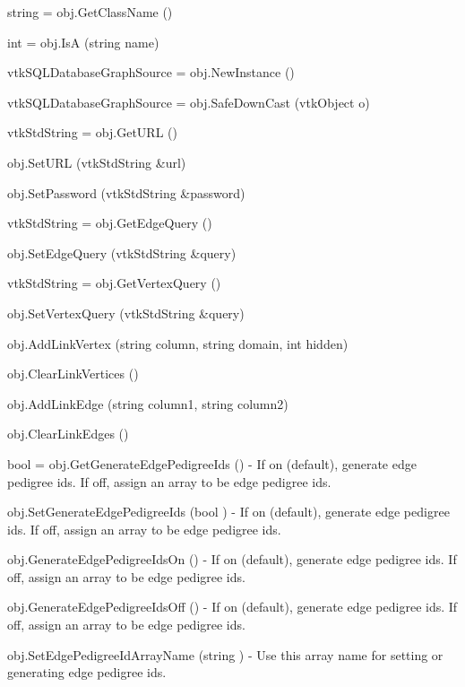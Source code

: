 \begin{DoxyItemize}
\item {\ttfamily string = obj.\-Get\-Class\-Name ()}  
\item {\ttfamily int = obj.\-Is\-A (string name)}  
\item {\ttfamily vtk\-S\-Q\-L\-Database\-Graph\-Source = obj.\-New\-Instance ()}  
\item {\ttfamily vtk\-S\-Q\-L\-Database\-Graph\-Source = obj.\-Safe\-Down\-Cast (vtk\-Object o)}  
\item {\ttfamily vtk\-Std\-String = obj.\-Get\-U\-R\-L ()}  
\item {\ttfamily obj.\-Set\-U\-R\-L (vtk\-Std\-String \&url)}  
\item {\ttfamily obj.\-Set\-Password (vtk\-Std\-String \&password)}  
\item {\ttfamily vtk\-Std\-String = obj.\-Get\-Edge\-Query ()}  
\item {\ttfamily obj.\-Set\-Edge\-Query (vtk\-Std\-String \&query)}  
\item {\ttfamily vtk\-Std\-String = obj.\-Get\-Vertex\-Query ()}  
\item {\ttfamily obj.\-Set\-Vertex\-Query (vtk\-Std\-String \&query)}  
\item {\ttfamily obj.\-Add\-Link\-Vertex (string column, string domain, int hidden)}  
\item {\ttfamily obj.\-Clear\-Link\-Vertices ()}  
\item {\ttfamily obj.\-Add\-Link\-Edge (string column1, string column2)}  
\item {\ttfamily obj.\-Clear\-Link\-Edges ()}  
\item {\ttfamily bool = obj.\-Get\-Generate\-Edge\-Pedigree\-Ids ()} -\/ If on (default), generate edge pedigree ids. If off, assign an array to be edge pedigree ids.  
\item {\ttfamily obj.\-Set\-Generate\-Edge\-Pedigree\-Ids (bool )} -\/ If on (default), generate edge pedigree ids. If off, assign an array to be edge pedigree ids.  
\item {\ttfamily obj.\-Generate\-Edge\-Pedigree\-Ids\-On ()} -\/ If on (default), generate edge pedigree ids. If off, assign an array to be edge pedigree ids.  
\item {\ttfamily obj.\-Generate\-Edge\-Pedigree\-Ids\-Off ()} -\/ If on (default), generate edge pedigree ids. If off, assign an array to be edge pedigree ids.  
\item {\ttfamily obj.\-Set\-Edge\-Pedigree\-Id\-Array\-Name (string )} -\/ Use this array name for setting or generating edge pedigree ids.  

\end{DoxyItemize}
